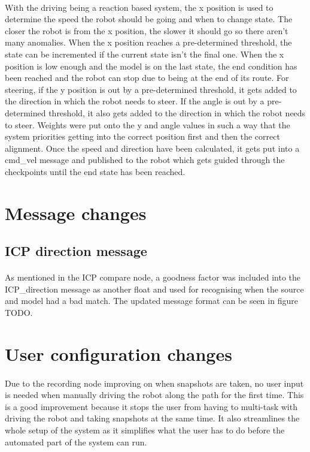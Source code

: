 \paragraph{}
With the driving being a reaction based system, the x position is used to determine the speed the robot should be going and when to change state. The closer the robot is from the x position, the slower it should go so there aren't many anomalies. When the x position reaches a pre-determined threshold, the state can be incremented if the current state isn't the final one. When the x position is low enough and the model is on the last state, the end condition has been reached and the robot can stop due to being at the end of its route. For steering, if the y position is out by a pre-determined threshold, it gets added to the direction in which the robot needs to steer. If the angle is out by a pre-determined threshold, it also gets added to the direction in which the robot needs to steer. Weights were put onto the y and angle values in such a way that the system priorities getting into the correct position first and then the correct alignment. Once the speed and direction have been calculated, it gets put into a cmd\_vel message and published to the robot which gets guided through the checkpoints until the end state has been reached.

\section{Message changes}
\subsection{ICP direction message}
\paragraph{}
As mentioned in the ICP compare node, a goodness factor was included into the ICP\_direction message as another float and used for recognising when the source and model had a bad match. The updated message format can be seen in figure TODO.

\section{User configuration changes}
\paragraph{}
Due to the recording node improving on when snapshots are taken, no user input is needed when manually driving the robot along the path for the first time. This is a good improvement because it stops the user from having to multi-task with driving the robot and taking snapshots at the same time. It also streamlines the whole setup of the system as it simplifies what the user has to do before the automated part of the system can run.
